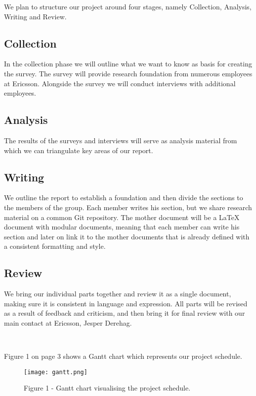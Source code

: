 \documentclass[ProjectPlan_innit.tex]{subfiles}
\begin{document}
We plan to structure our project around four stages, namely Collection, Analysis, Writing and Review. 

\subsection{Collection}
In the collection phase we will outline what we want to know as basis for creating the survey. The survey will provide research foundation from numerous employees at Ericsson. Alongside the survey we will conduct interviews with additional employees. 

\subsection{Analysis}
The results of the surveys and interviews will serve as analysis material from which we can triangulate key areas of our report.

\subsection{Writing}
We outline the report to establish a foundation and then divide the sections to the members of the group. Each member writes his section, but we share research material on a common Git repository. The mother document will be a LaTeX document with modular documents, meaning that each member can write his section and later on link it to the mother documents that is already defined with a consistent formatting and style.

\subsection{Review}
We bring our individual parts together and review it as a single document, making sure it is consistent in language and expression. All parts will be revised as a result of feedback and criticism, and then bring it for final review with our main contact at Ericsson, Jesper Derehag.  

\hspace{0pt} \

Figure 1 on page 3 shows a Gantt chart which represents our project schedule. 

\begin{figure*}[H!]
	\texttt{[image: gantt.png]}
	\caption{Figure 1 - Gantt chart visualising the project schedule.}
	\label{AAA}
\end{figure*}
\end{document}
